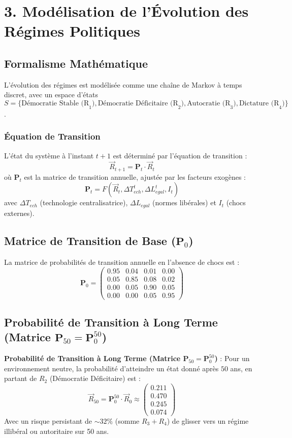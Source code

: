 \documentclass[a4paper,12pt]{report}
\begin{document}
	
	\section*{3. Modélisation de l'Évolution des Régimes Politiques}
	\label{sec:modelisation_regimes}
	
	\subsection*{Formalisme Mathématique}
	L'évolution des régimes est modélisée comme une chaîne de Markov à temps discret, avec un espace d'états $S = \{ \text{Démocratie Stable (R}_1\text{)}, \text{Démocratie Déficitaire (R}_2\text{)}, \text{Autocratie (R}_3\text{)}, \text{Dictature (R}_4\text{)} \}$.
	\subsubsection{Équation de Transition}
	L'état du système à l'instant $t+1$ est déterminé par l'équation de transition :
	$$
	\vec{R}_{t+1} = \mathbf{P}_t \cdot \vec{R}_t
	$$
	où $\mathbf{P}_t$ est la matrice de transition annuelle, ajustée par les facteurs exogènes :
	$$
	\mathbf{P}_t = F (\vec{R}_t, \Delta T_{ech}^t, \Delta L_{egal}^t, I_t)
	$$
	avec $\Delta T_{ech}$ (technologie centralisatrice), $\Delta L_{egal}$ (normes libérales) et $I_t$ (chocs externes).
	
	\subsection{Matrice de Transition de Base ($\mathbf{P}_0$)}
	La matrice de probabilités de transition annuelle en l'absence de chocs est :
	$$
	\mathbf{P}_0 = \begin{pmatrix}
		0.95 & 0.04 & 0.01 & 0.00 \\
		0.05 & 0.85 & 0.08 & 0.02 \\
		0.00 & 0.05 & 0.90 & 0.05 \\
		0.00 & 0.00 & 0.05 & 0.95
	\end{pmatrix}
	$$
	
	\subsection*{Probabilité de Transition à Long Terme (Matrice $\mathbf{P}_{50} = \mathbf{P}_0^{50}$)}
	\textbf{Probabilité de Transition à Long Terme (Matrice $\mathbf{P}_{50} = \mathbf{P}_0^{50}$)} :
	Pour un environnement neutre, la probabilité d'atteindre un état donné après $50$ ans, en partant de $R_2$ (Démocratie Déficitaire) est :
	$$
	\vec{R}_{50} = \mathbf{P}_0^{50} \cdot \vec{R}_0 \approx \begin{pmatrix}
		0.211 \\
		0.470 \\
		0.245 \\
		0.074
	\end{pmatrix}
	$$
	Avec un risque persistant de $\sim 32\%$ (somme $R_3+R_4$) de glisser vers un régime illibéral ou autoritaire sur 50 ans.
	
\end{document}
